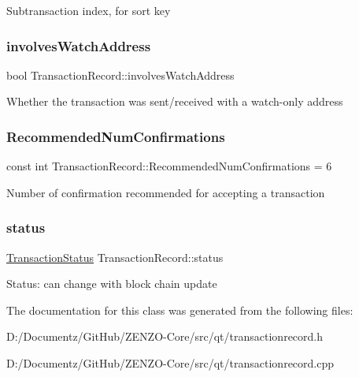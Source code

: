 Subtransaction index, for sort key \mbox{\label{class_transaction_record_ac938161128e04ca5d044d8a19827b0e2}} 
\subsubsection{\texorpdfstring{involvesWatchAddress}{involvesWatchAddress}}
{\footnotesize\ttfamily bool Transaction\+Record\+::involves\+Watch\+Address}

Whether the transaction was sent/received with a watch-\/only address \mbox{\label{class_transaction_record_a1cdf534b1ab2495c839f87beb053eaf8}} 
\subsubsection{\texorpdfstring{RecommendedNumConfirmations}{RecommendedNumConfirmations}}
{\footnotesize\ttfamily const int Transaction\+Record\+::\+Recommended\+Num\+Confirmations = 6\hspace{0.3cm}{\ttfamily [static]}}

Number of confirmation recommended for accepting a transaction \mbox{\label{class_transaction_record_a50342213092284a9994f2903991134c0}} 
\subsubsection{\texorpdfstring{status}{status}}
{\footnotesize\ttfamily \mbox{\hyperlink{class_transaction_status}{Transaction\+Status}} Transaction\+Record\+::status}

Status\+: can change with block chain update 

The documentation for this class was generated from the following files\+:\begin{DoxyCompactItemize}
\item 
D\+:/\+Documentz/\+Git\+Hub/\+Z\+E\+N\+Z\+O-\/\+Core/src/qt/transactionrecord.\+h\item 
D\+:/\+Documentz/\+Git\+Hub/\+Z\+E\+N\+Z\+O-\/\+Core/src/qt/transactionrecord.\+cpp\end{DoxyCompactItemize}
